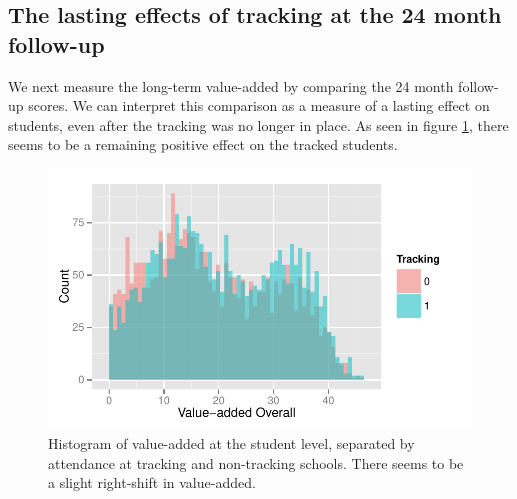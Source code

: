 \documentclass[11pt]{article}
\begin{document}
%
% 

 \subsection{The lasting effects of tracking at the 24 month follow-up}

We next measure the long-term value-added by comparing the 24 month follow-up scores. We can interpret this comparison as a measure of a lasting effect on students, even after the tracking was no longer in place. As seen in figure \ref{fig:va-hist}, there seems to be a remaining positive effect on the tracked students.

  \begin{figure}[H]
  	\centering
  	\includegraphics[scale=0.8]{../Figures/va-hist.pdf}
  	\caption{Histogram of value-added at the student level, separated by attendance at tracking and non-tracking schools.  There seems to be a slight right-shift in value-added.}
  	\label{fig:va-hist}
  \end{figure} 
\end{document}
